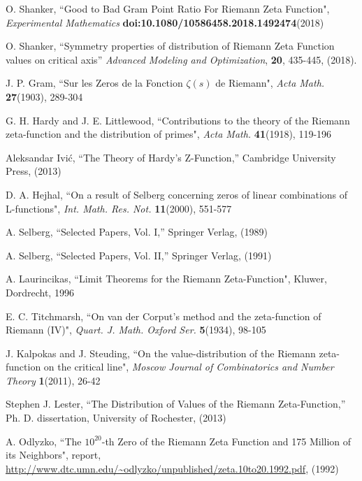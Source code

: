 \documentclass[twoside]{article}
\begin{document}

\begin{thebibliography}{10}

 O. Shanker, 
``Good to Bad Gram Point Ratio For Riemann Zeta Function",
{\it Experimental Mathematics} {\bf doi:10.1080/10586458.2018.1492474}(2018)

 O. Shanker, ``Symmetry properties of distribution of Riemann Zeta Function values on critical axis''
{\it Advanced Modeling and Optimization}, {\bf 20}, 435-445, (2018). 

 J. P. Gram, 
``Sur les Zeros de la Fonction  $\zeta ( s )$  de Riemann",
{\it Acta Math.} {\bf27}(1903), 289-304



 G. H. Hardy and J. E. Littlewood,
``Contributions to the theory of the Riemann
zeta-function and the distribution of primes",
{\it Acta Math.} {\bf41}(1918), 119-196

 Aleksandar Ivi\'c, ``The Theory of Hardy's Z-Function,''
Cambridge University Press,  (2013)

 D. A. Hejhal,
``On a result of Selberg concerning zeros of linear combinations
of L-functions", 
{\it Int. Math. Res. Not.} {\bf11}(2000), 551-577

 A. Selberg, ``Selected Papers, Vol. I,''
Springer Verlag,  (1989)

 A. Selberg, ``Selected Papers, Vol. II,''
Springer Verlag,  (1991)



 A. Laurincikas,
``Limit Theorems for the Riemann Zeta-Function",
Kluwer, Dordrecht, 1996

 E. C. Titchmarsh,
``On van der Corput's method and the zeta-function of Riemann (IV)",
{\it Quart. J. Math. Oxford Ser.} {\bf5}(1934), 98-105

 J. Kalpokas and J. Steuding,
``On the value-distribution of the Riemann zeta-function on the critical line", 
{\it Moscow Journal of Combinatorics and
Number Theory} {\bf1}(2011), 26-42

 Stephen J. Lester, ``The Distribution of Values of the
Riemann Zeta-Function,''
Ph. D. dissertation, University of Rochester,  (2013)

  A. Odlyzko,
``The $10^{20}$-th Zero of the Riemann Zeta
Function and 175 Million of its Neighbors", report,
\url{http://www.dtc.umn.edu/~odlyzko/unpublished/zeta.10to20.1992.pdf}, (1992)


\end{thebibliography}
\end{document}
